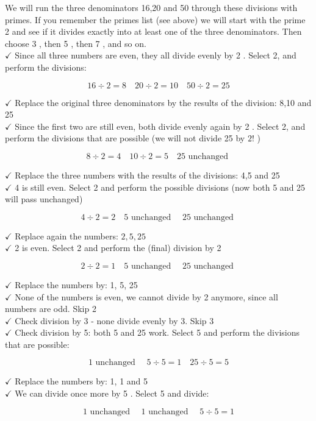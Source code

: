 \documentclass{ximera}
\begin{document}
We will run the three denominators 16,20 and 50 through these divisions with primes. If you remember the primes list (see above) we will start with the prime 2 and see if it divides exactly into at least one of the three denominators. Then choose 3 , then 5 , then 7 , and so on.\\
$\checkmark$ Since all three numbers are even, they all divide evenly by 2 . Select 2, and perform the divisions:

$$16 \div 2=8 \quad 20 \div 2=10 \quad 50 \div 2=25$$

$\checkmark$ Replace the original three denominators by the results of the division: 8,10 and 25\\
$\checkmark$ Since the first two are still even, both divide evenly again by 2 . Select 2, and perform the divisions that are possible (we will not divide 25 by $2!$ )

$$8 \div 2=4 \quad 10 \div 2=5 \quad 25 \text { unchanged }$$

$\checkmark$ Replace the three numbers with the results of the divisions: 4,5 and 25\\
$\checkmark$ 4 is still even. Select 2 and perform the possible divisions (now both 5 and 25 will pass unchanged)

$$4 \div 2=2 \quad 5 \text { unchanged } \quad 25 \text { unchanged }$$

$\checkmark$ Replace again the numbers: $2,5,25$\\
$\checkmark$ 2 is even. Select 2 and perform the (final) division by 2

$$2 \div 2=1 \quad 5 \text { unchanged } \quad 25 \text { unchanged }$$

$\checkmark$ Replace the numbers by: 1, 5, 25\\
$\checkmark$ None of the numbers is even, we cannot divide by 2 anymore, since all numbers are odd. Skip 2\\
$\checkmark$ Check division by 3 - none divide evenly by 3. Skip 3\\
$\checkmark$ Check division by 5: both 5 and 25 work. Select 5 and perform the divisions that are possible:

$$1 \text { unchanged } \quad 5 \div 5=1 \quad 25 \div 5=5$$

$\checkmark$ Replace the numbers by: 1, 1 and 5\\
$\checkmark$ We can divide once more by 5 . Select 5 and divide:

$$1 \text { unchanged } \quad 1 \text { unchanged } \quad 5 \div 5=1$$
\end{document}
